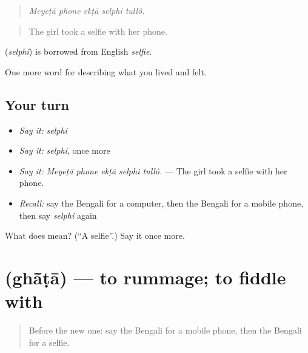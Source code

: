 \begin{quote}
    
\end{quote}

\begin{quote}
\emph{Meyeṭā phone ekṭā selphi tullô.}
\end{quote}

\begin{quote}
The girl took a selfie with her phone.
\end{quote}

\begin{cousinweb}
\textbf{} (\emph{selphi}) is borrowed from English \emph{selfie}.
\end{cousinweb}

\begin{grammarlens}[title={What you've built}]
One more word for describing what you lived and felt.
\end{grammarlens}

\subsection*{Your turn}
\begin{itemize}
\raggedright
  \item \emph{Say it:} \emph{selphi}
  \item \emph{Say it:} \emph{selphi}, once more
  \item \emph{Say it:} \emph{Meyeṭā phone ekṭā selphi tullô.} — The girl took a selfie with her phone.
  \item \emph{Recall:} say the Bengali for a computer, then the Bengali for a mobile phone, then say \emph{selphi} again
\end{itemize}

\begin{tcolorbox}[breakable,colback=teal!4,colframe=teal!35!black,title={Before you move on}]
What does  mean? (\textquotedblleft{}A selfie\textquotedblright{}.) Say it once more.
\end{tcolorbox}
\section[\texorpdfstring{\bn{ঘাঁটা} (ghā̃ṭā)}{ঘাঁটা (ghā̃ṭā)}]{ (ghā̃ṭā) — to rummage; to fiddle with}

\label{lesson:BN-C502-ghata}



\begin{quote}
Before the new one: say the Bengali for a mobile phone, then the Bengali for a selfie.
\end{quote}

